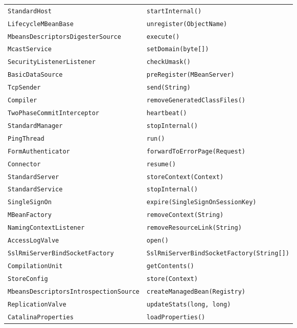 \begin{center}
\begin{longtable}{ll}
\lstinline/StandardHost/&{\lstinline/startInternal()/}\\
\lstinline/LifecycleMBeanBase/&{\lstinline/unregister(ObjectName)/}\\
\lstinline/MbeansDescriptorsDigesterSource/&{\lstinline/execute()/}\\
\lstinline/McastService/&{\lstinline/setDomain(byte[])/}\\
\lstinline/SecurityListenerListener/&{\lstinline/checkUmask()/}\\
\lstinline/BasicDataSource/&{\lstinline/preRegister(MBeanServer)/}\\
\lstinline/TcpSender/&{\lstinline/send(String)/}\\
\lstinline/Compiler/&{\lstinline/removeGeneratedClassFiles()/}\\
\lstinline/TwoPhaseCommitInterceptor/&{\lstinline/heartbeat()/}\\
\lstinline/StandardManager/&{\lstinline/stopInternal()/}\\
\lstinline/PingThread/&{\lstinline/run()/}\\
\lstinline/FormAuthenticator/&{\lstinline/forwardToErrorPage(Request)/}\\
\lstinline/Connector/&{\lstinline/resume()/}\\
\lstinline/StandardServer/&{\lstinline/storeContext(Context)/}\\
\lstinline/StandardService/&{\lstinline/stopInternal()/}\\
\lstinline/SingleSignOn/&{\lstinline/expire(SingleSignOnSessionKey)/}\\
\lstinline/MBeanFactory/&{\lstinline/removeContext(String)/}\\
\lstinline/NamingContextListener/&{\lstinline/removeResourceLink(String)/}\\
\lstinline/AccessLogValve/&{\lstinline/open()/}\\
\lstinline/SslRmiServerBindSocketFactory/&{\lstinline/SslRmiServerBindSocketFactory(String[])/}\\
\lstinline/CompilationUnit/&{\lstinline/getContents()/}\\
\lstinline/StoreConfig/&{\lstinline/store(Context)/}\\
\lstinline/MbeansDescriptorsIntrospectionSource/&{\lstinline/createManagedBean(Registry)/}\\
\lstinline/ReplicationValve/&{\lstinline/updateStats(long, long)/}\\
\lstinline/CatalinaProperties/&{\lstinline/loadProperties()/}\\

\end{longtable}
\end{center}
